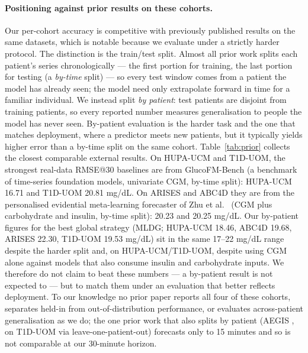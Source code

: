 \documentclass[10pt,letterpaper]{article}
\begin{document}
\paragraph{Positioning against prior results on these cohorts.} Our per-cohort
accuracy is competitive with previously published results on the same datasets,
which is notable because we evaluate under a strictly harder protocol. The
distinction is the train/test split. Almost all prior work splits each
patient's series chronologically --- the first portion for training, the last
portion for testing (a \emph{by-time} split) --- so every test window comes from
a patient the model has already seen; the model need only extrapolate forward in
time for a familiar individual. We instead split \emph{by patient}: test patients
are disjoint from training patients, so every reported number measures
generalisation to people the model has never seen. By-patient evaluation is the
harder task and the one that matches deployment, where a predictor meets new
patients, but it typically yields higher error than a by-time split on the same
cohort. Table~\ref{tab:prior} collects the closest comparable external results.
On HUPA-UCM and T1D-UOM, the strongest real-data RMSE@30 baselines are from
GlucoFM-Bench \cite{lu2026glucofmbench} (a benchmark of time-series foundation
models, univariate CGM, by-time split): HUPA-UCM 16.71 and T1D-UOM 20.81 mg/dL.
On ARISES and ABC4D they are from the personalised evidential meta-learning
forecaster of Zhu et al.\ \cite{zhu2023fcnn} (CGM plus carbohydrate and insulin,
by-time split): 20.23 and 20.25 mg/dL. Our by-patient figures for the best
global strategy (MLDG; HUPA-UCM 18.46, ABC4D 19.68, ARISES 22.30, T1D-UOM 19.53
mg/dL) sit in the same 17--22 mg/dL range despite the harder split and, on
HUPA-UCM/T1D-UOM, despite using CGM alone against models that also consume
insulin and carbohydrate inputs. We therefore do not claim to beat these numbers
--- a by-patient result is not expected to --- but to match them under an
evaluation that better reflects deployment. To our knowledge no prior paper
reports all four of these cohorts, separates held-in from out-of-distribution
performance, or evaluates across-patient generalisation as we do; the one prior
work that also splits by patient (AEGIS \cite{pansheriya2026aegis}, on T1D-UOM
via leave-one-patient-out) forecasts only to 15 minutes and so is not comparable
at our 30-minute horizon.
\end{document}
